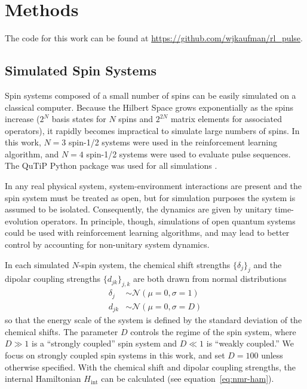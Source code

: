 
\chapter{Methods} %



The code for this work can be found at \url{https://github.com/wjkaufman/rl_pulse}.

\section{Simulated Spin Systems}

Spin systems composed of a small number of spins can be easily simulated on a classical computer. Because the Hilbert Space grows exponentially as the spins increase ($2^N$ basis states for $N$ spins and $2^{2N}$ matrix elements for associated operators), it rapidly becomes impractical to simulate large numbers of spins. In this work, $N=3$ spin-1/2 systems were used in the reinforcement learning algorithm, and $N=4$ spin-1/2 systems were used to evaluate pulse sequences. The QuTiP Python package was used for all simulations \cite{Johansson_2013}.

In any real physical system, system-environment interactions are present and the spin system must be treated as open, but for simulation purposes the system is assumed to be isolated.
Consequently, the dynamics are given by unitary time-evolution operators. In principle, though, simulations of open quantum systems could be used with reinforcement learning algorithms, and may lead to better control by accounting for non-unitary system dynamics.

In each simulated $N$-spin system, the chemical shift strengths $\{\delta_j\}_j$ and the dipolar coupling strengths $\{d_{jk}\}_{j,k}$ are both drawn from normal distributions
\begin{align*}
    \delta_j &\sim \mathcal{N}(\mu=0, \sigma=1) \\
    d_{jk} &\sim \mathcal{N}(\mu=0, \sigma=D)
\end{align*}
so that the energy scale of the system is defined by the standard deviation of the chemical shifts. The parameter $D$ controls the regime of the spin system, where $D \gg 1$ is a ``strongly coupled'' spin system and $D \ll 1$ is ``weakly coupled.'' We focus on strongly coupled spin systems in this work, and set $D = 100$ unless otherwise specified. With the chemical shift and dipolar coupling strengths, the internal Hamiltonian $H_{\text{int}}$ can be calculated (see equation~\ref{eq:nmr-ham}).

